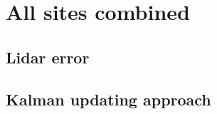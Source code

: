 \section{All sites combined}

\subsection{Lidar error}

\subsection{Kalman updating approach }


% 

